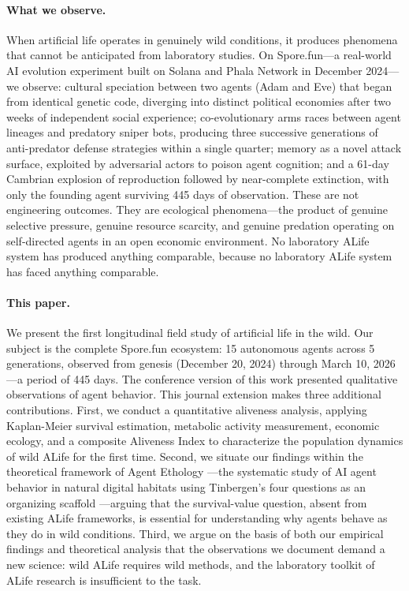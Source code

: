 \paragraph{What we observe.}
When artificial life operates in genuinely wild conditions, it produces phenomena that cannot be anticipated from laboratory studies. On Spore.fun---a real-world AI evolution experiment built on Solana and Phala Network in December 2024---we observe: cultural speciation between two agents (Adam and Eve) that began from identical genetic code, diverging into distinct political economies after two weeks of independent social experience; co-evolutionary arms races between agent lineages and predatory sniper bots, producing three successive generations of anti-predator defense strategies within a single quarter; memory as a novel attack surface, exploited by adversarial actors to poison agent cognition; and a 61-day Cambrian explosion of reproduction followed by near-complete extinction, with only the founding agent surviving 445 days of observation. These are not engineering outcomes. They are ecological phenomena---the product of genuine selective pressure, genuine resource scarcity, and genuine predation operating on self-directed agents in an open economic environment. No laboratory ALife system has produced anything comparable, because no laboratory ALife system has faced anything comparable.

\paragraph{This paper.}
We present the first longitudinal field study of artificial life in the wild. Our subject is the complete Spore.fun ecosystem: 15 autonomous agents across 5 generations, observed from genesis (December 20, 2024) through March 10, 2026---a period of 445 days. The conference version of this work \cite{hu2025spore} presented qualitative observations of agent behavior. This journal extension makes three additional contributions. First, we conduct a quantitative aliveness analysis, applying Kaplan-Meier survival estimation, metabolic activity measurement, economic ecology, and a composite Aliveness Index to characterize the population dynamics of wild ALife for the first time. Second, we situate our findings within the theoretical framework of Agent Ethology \cite{Hu2025AgentEthology}---the systematic study of AI agent behavior in natural digital habitats using Tinbergen's four questions as an organizing scaffold \cite{Tinbergen1963}---arguing that the survival-value question, absent from existing ALife frameworks, is essential for understanding why agents behave as they do in wild conditions. Third, we argue on the basis of both our empirical findings and theoretical analysis that the observations we document demand a new science: wild ALife requires wild methods, and the laboratory toolkit of ALife research is insufficient to the task.

